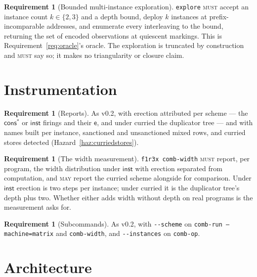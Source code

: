 \documentclass[11pt,a4paper]{article}
\newcommand{\code}[1]{\texttt{#1}}
\newcommand{\MUST}{\textsc{must}}
\newcommand{\MAY}{\textsc{may}}
\newcommand{\ev}{\mathsf{e}}
\theoremstyle{definition}
\newtheorem{requirement}[definition]{Requirement}
\theoremstyle{plain}
\newcommand{\inst}{\mathsf{inst}}
\newcommand{\cstar}{\mathsf{cons}^{*}}
\begin{document}
\begin{requirement}[Bounded multi-instance exploration]\label{req:multiexplore}
\code{explore} \MUST{} accept an instance count $k \in \{2,3\}$ and a depth
bound, deploy $k$ instances at prefix-incomparable addresses, and enumerate
every interleaving to the bound, returning the set of encoded observations at
quiescent markings. This is Requirement~\ref{req:oracle}'s oracle. The
exploration is truncated by construction and \MUST{} say so; it makes no
triangularity or closure claim.
\end{requirement}

\section{Instrumentation}\label{sec:instr}

\begin{requirement}[Reports]\label{req:reports}
As v0.2, with erection attributed per scheme --- the $\cstar$ or $\inst$
firings and their $\ev$, and under curried the duplicator tree --- and with
names built per instance, sanctioned and unsanctioned mixed rows, and curried
stores detected (Hazard~\ref{haz:curriedstores}).
\end{requirement}

\begin{requirement}[The width measurement]\label{req:widthcmd}
\code{f1r3x comb-width} \MUST{} report, per program, the width distribution
under $\inst$ with erection separated from computation, and \MAY{} report the
curried scheme alongside for comparison. Under $\inst$
erection is two steps per instance; under curried it is the duplicator tree's
depth plus two. Whether either adds width without depth on real programs is
the measurement \cite[Obl.~13.7]{matnote} asks for.
\end{requirement}

\begin{requirement}[Subcommands]\label{req:fx}
As v0.2, with \code{-{}-scheme} on \code{comb-run --machine=matrix} and
\code{comb-width}, and \code{-{}-instances} on \code{comb-op}.
\end{requirement}

\section{Architecture}\label{sec:arch}
\end{document}
